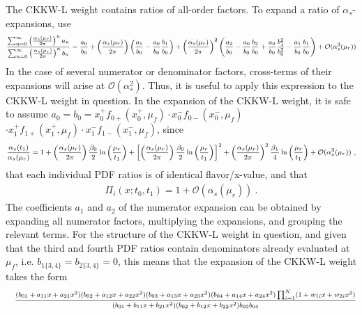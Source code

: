\documentclass[a4paper,11pt]{article}
\newcommand{\mksmall}[1]{\textnormal{\smaller$#1$}}
\newcommand{\xf}[3]{#2 f_{#1}\left(#2, #3\right)}
\newcommand{\noem}[4]{\Pi_{#1}\left(#2; #3, #4\right)}
\begin{document}
The CKKW-L weight contains ratios of all-order factors. To expand a ratio of $\alpha_s$-expansions, use
\begin{eqnarray*}
\mksmall{\frac{\sum_{n=0}^\infty \left(\frac{\alpha_s(\mu_r)}{2\pi}\right)^n a_n }{ \sum_{n=0}^\infty \left(\frac{\alpha_s(\mu_r)}{2\pi}\right)^n b_n  }
=
\frac{a_0}{b_0}
+
\left(\frac{\alpha_s(\mu_r)}{2\pi}\right) \left( \frac{a_1}{b_0} - \frac{a_0}{b_0} \frac{b_1}{b_0} \right) 
+
\left(\frac{\alpha_s(\mu_r)}{2\pi}\right)^2 \left( \frac{a_2}{b_0} - \frac{a_0}{b_0} \frac{b_2}{b_0} +   \frac{a_0}{b_0}  \frac{b_1^2}{b_0^2} -  \frac{a_1}{b_0} \frac{b_1}{b_0} \right) 
+ \mathcal{O}(\alpha_s^3(\mu_r))}
\end{eqnarray*}
In the case of several numerator or denominator factors, cross-terms of their expansions will arise at $\mathcal{O}(\alpha_s^2)$. Thus, it is useful to apply this expression to the CKKW-L weight in question. In the expansion of the CKKW-L weight, it is safe to assume $a_0=b_0=\xf{0+}{x_0^+}{\mu_f} \cdot \xf{0-}{x_0^-}{\mu_f}$$\cdot\xf{1+}{x_1^+}{\mu_f} \cdot \xf{1-}{x_1^-}{\mu_f}$, since
\begin{eqnarray*}
\mksmall{\frac{\alpha_s(t_1)}{\alpha_s(\mu_r)} = 1 + \left(\frac{\alpha_s(\mu_r)}{2\pi}\right) \frac{\beta_0}{2}\ln\left(\frac{\mu_r}{t_1}\right)
+  \left[\left(\frac{\alpha_s(\mu_r)}{2\pi}\right) \frac{\beta_0}{2}\ln\left(\frac{\mu_r}{t_1}\right)\right]^2
+  \left(\frac{\alpha_s(\mu_r)}{2\pi}\right)^2 \frac{\beta_1}{4}\ln\left(\frac{\mu_r}{t_1}\right)
+ \mathcal{O}(\alpha_s^3(\mu_r))~,}
\end{eqnarray*}
that each individual PDF ratios is of identical flavor/x-value, and that
\begin{eqnarray*}
\noem{i}{x}{t_0}{t_1} = 1 
+ \mathcal{O}(\alpha_s(\mu_r))~.
\end{eqnarray*}
The coefficients $a_1$ and $a_2$ of the numerator expansion can be obtained by expanding all numerator factors, multiplying the expansions, and grouping the relevant terms.
For the structure of the CKKW-L weight in question, and given that the third and fourth PDF ratios contain denominators already evaluated at $\mu_f$, i.e. $b_{1\{3,4\}}=b_{2\{3,4\}}=0$, this means that the expansion of the CKKW-L weight takes the form
\begin{eqnarray*}
&&
\mksmall{
\frac{(b_{01} + a_{11} x + a_{21} x^2) (b_{02} + a_{12} x + a_{22} x^2) (b_{03} + a_{13} x + a_{23} x^2) (b_{04} + a_{14} x + a_{24} x^2) \prod_{i=1}^N (1 + w_{1i} x +w_{2i} x^2)} {
(b_{01} + b_{11} x + b_{21} x^2 ) (b_{02} + b_{12} x + b_{22} x^2 ) b_{03}  b_{04}}
}
\end{eqnarray*}$$
\end{document}
